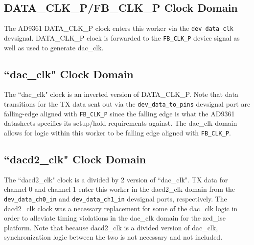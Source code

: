 \documentclass{article}
\begin{document}
\subsection*{DATA\_CLK\_P/FB\_CLK\_P Clock Domain}
The AD9361 DATA\_CLK\_P clock enters this worker via the \verb+dev_data_clk+ devsignal. DATA\_CLK\_P clock is forwarded to the \verb+FB_CLK_P+ device signal as well as used to generate dac\_clk.
\subsection*{``dac\_clk" Clock Domain}
The ``dac\_clk" clock is an inverted version of DATA\_CLK\_P. Note that data transitions for the TX data sent out via the \verb+dev_data_to_pins+ devsignal port are falling-edge aligned with \verb+FB_CLK_P+ since the falling edge is what the AD9361 datasheets specifies its setup/hold requirements against\cite{adi_ug570}. The dac\_clk domain allows for logic within this worker to be falling edge aligned with \verb+FB_CLK_P+.
\subsection*{``dacd2\_clk" Clock Domain}
The ``dacd2\_clk" clock is a divided by 2 version of ``dac\_clk". TX data for channel 0 and channel 1 enter this worker in the dacd2\_clk domain from the  \verb+dev_data_ch0_in+ and \verb+dev_data_ch1_in+ devsignal ports, respectively. The dacd2\_clk clock was a necessary replacement for some of the dac\_clk logic in order to alleviate timing violations in the dac\_clk domain for the zed\_ise platform. Note that because dacd2\_clk is a divided version of dac\_clk, synchronization logic between the two is not necessary and not included.
\end{document}
